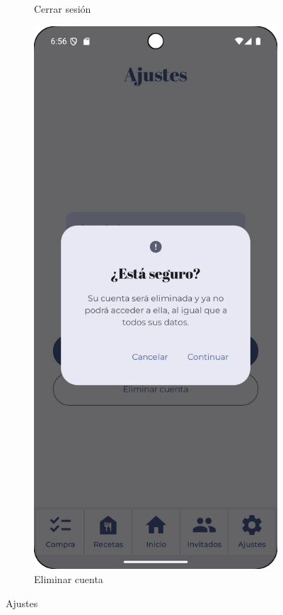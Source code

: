 \begin{figure}[H]
\begin{subfigure}[b]{0.3\textwidth}
      \caption{Cerrar sesión}
      \label{fig:sign-out}
    \end{subfigure}
    \hfill
    \begin{subfigure}[b]{0.3\textwidth}
      \includegraphics[width=\textwidth]{./img/manual/delete_account_confirm.png}
      \caption{Eliminar cuenta}
      \label{fig:delete}
    \end{subfigure}

    \caption{Ajustes}
    \label{fig:login}
\end{figure}

